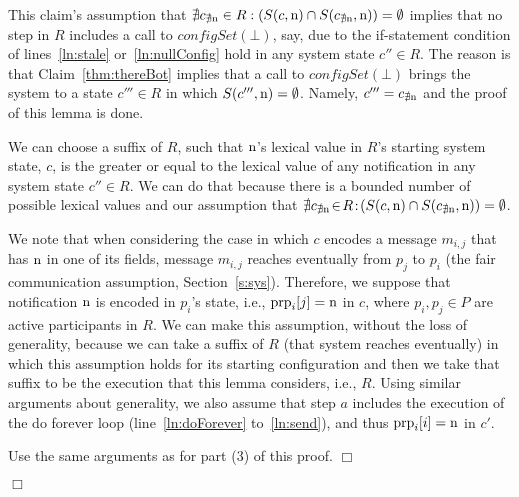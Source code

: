 \documentclass[11pt]{article}
\newcommand{\notif}{prp}
\newenvironment{proof}{\noindent{\bf Proof.}}{\hfill$\Box$}
\begin{document}
\begin{proof}
\begin{proof}
This claim's assumption that $\nexists c_{\nexists \textnormal{n}} \in R:  (S(c,\textnormal{n}) \cap S(c_{\nexists \textnormal{n}},\textnormal{n})) = \emptyset$ implies that no step in $R$ includes a call to $configSet(\bot)$, say, due to the if-statement condition of lines~\ref{ln:stale} or~\ref{ln:nullConfig} hold in any system state $c'' \in R$. The reason is that Claim~\ref{thm:thereBot} implies that a call to $configSet(\bot)$ brings the system to a state  $c''' \in R$ in which $S(c''',\textnormal{n})=\emptyset$. Namely, $c''' = c_{\nexists \textnormal{n}}$ and the proof of this  lemma is done.

We can choose a suffix of $R$, such that $\textnormal{n}$'s  lexical value in $R$'s starting system state, $c$, is the greater or equal to the lexical value of any notification in any system state $c'' \in  R$. We can do that because there is a bounded number of possible lexical values and our assumption that $\nexists c_{\nexists \textnormal{n}} \!\in\! R\!:\!  (S(c,\textnormal{n}) \cap S(c_{\nexists \textnormal{n}},\textnormal{n})) = \emptyset$. 

We note that when considering the case in which $c$ encodes a message $m_{i,j}$ that has $\textnormal{n}$ in one of its fields, message $m_{i,j}$ reaches eventually from $p_j$ to $p_i$ (the fair communication assumption, Section~\ref{s:sys}). Therefore, we suppose that notification $\textnormal{n}$ is encoded in $p_i$'s state, i.e., $\textnormal{\notif}_{i}[j] = \textnormal{n}$ in $c$, where $p_i, p_j \in P$ are active participants in $R$. We can make this assumption, without the loss of generality, because we can take a suffix of $R$ (that system reaches eventually) in which this assumption holds for its starting configuration and then we take that suffix to be the execution that this lemma considers, i.e., $R$.
Using similar arguments about generality, we also assume that step $a$ includes the execution of the do forever loop (line~\ref{ln:doForever} to~\ref{ln:send}), and thus $\textnormal{\notif}_{i}[i] = \textnormal{n}$ in $c'$. 

Use the same arguments as for part (3) of this proof.
\end{proof}



\end{proof}
\end{document}
